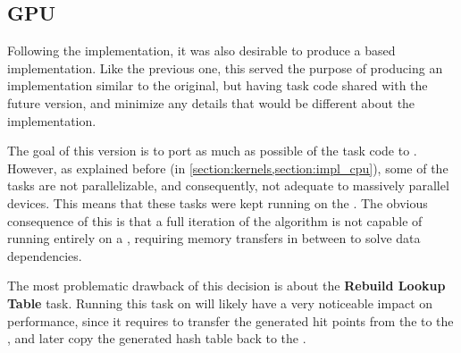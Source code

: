 \documentclass[main.tex]{subfiles}
\begin{document}
\subsection{GPU} \label{section:impl_cuda}

Following the \cpu implementation, it was also desirable to produce a \cuda based implementation. Like the previous one, this served the purpose of producing an implementation similar to the original, but having task code shared with the future \starpu version, and minimize any details that would be different about the implementation.

The goal of this version is to port as much as possible of the \cpu task code to \cuda. However, as explained before (in \cref{section:kernels,section:impl_cpu}), some of the tasks are not parallelizable, and consequently, not adequate to massively parallel devices. This means that these tasks were kept running on the \cpu. The obvious consequence of this is that a full iteration of the algorithm is not capable of running entirely on a \gpu, requiring memory transfers in between to solve data dependencies.

The most problematic drawback of this decision is about the \textbf{Rebuild Lookup Table} task. Running this task on \cpu will likely have a very noticeable impact on performance, since it requires to transfer the generated hit points from the \gpu to the \cpu, and later copy the generated hash table back to the \gpu.


\end{document}
